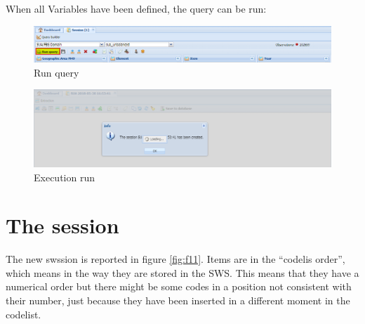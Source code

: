 \documentclass[]{article}
\begin{document}
When all Variables have been defined, the query can be run:

\begin{figure}[H]

{\centering \includegraphics[width=1\linewidth]{images/pullData/09_run} 

}

\caption{\label{fig:f9}Run query}\label{fig:f9}
\end{figure}

\begin{figure}[H]

{\centering \includegraphics[width=1\linewidth]{images/pullData/10_wait} 

}

\caption{\label{fig:f10}Execution run}\label{fig:f10}
\end{figure}

\section{The session}\label{the-session}

The new swssion is reported in figure \ref{fig:f11}. Items are in the
``codelis order'', which means in the way they are stored in the SWS.
This means that they have a numerical order but there might be some
codes in a position not consistent with their number, just because they
have been inserted in a different moment in the codelist.
\end{document}
